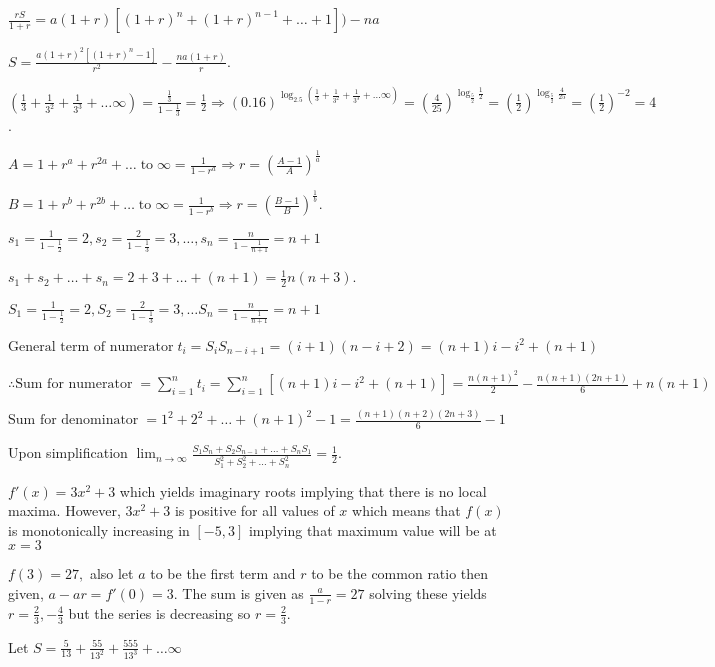   $\frac{rS}{1 + r} = a(1 + r)[(1 + r)^n + (1 + r)^{n - 1}  + \ldots + 1]) - na$

  $S = \frac{a(1 + r)^2[(1 + r)^n - 1]}{r^2} - \frac{na(1 + r)}{r}$.
\item $\left(\frac{1}{3} + \frac{1}{3^2} + \frac{1}{3^3} + \ldots \infty\right) = \frac{\frac{1}{3}}{1 -
  \frac{1}{3}} = \frac{1}{2} \Rightarrow (0.16)^{\log_{2.5}\left(\frac{1}{3} + \frac{1}{3^2} + \frac{1}{3^3} + \ldots \infty\right)} =
  \left(\frac{4}{25}\right)^{\log_{\tfrac{5}{2}}\frac{1}{2}} =
  \left(\frac{1}{2}\right)^{\log_{\tfrac{5}{2}}\frac{4}{25}} = \left(\frac{1}{2}\right)^{-2} = 4$.
\item $A = 1 + r^a + r^{2a} + \ldots \;\text{to}\;\infty = \frac{1}{1 - r^a} \Rightarrow r = \left(\frac{A - 1}{A}\right)^{\frac{1}{a}}$

  $B = 1 + r^b + r^{2b} + \ldots \;\text{to}\;\infty = \frac{1}{1 - r^b} \Rightarrow r = \left(\frac{B -
  1}{B}\right)^{\frac{1}{b}}$.
\item $s_1 = \frac{1}{1 - \frac{1}{2}} = 2, s_2 = \frac{2}{1 - \frac{1}{3}} = 3,\ldots, s_n = \frac{n}{1 -
  \frac{1}{n + 1}} = n + 1$

  $s_1 + s_2 + \ldots + s_n = 2 + 3 + \ldots + (n + 1) = \frac{1}{2}n(n + 3)$.
\item $S_1 = \frac{1}{1 - \frac{1}{2}} = 2, S_2 = \frac{2}{1 - \frac{1}{3}} = 3,\ldots S_n = \frac{n}{1 -
  \frac{1}{n + 1}} = n + 1$

  $\text{General term of numerator}\;t_i = S_iS_{n - i + 1} = (i + 1)(n - i + 2) = (n + 1)i - i^2 + (n + 1)$

  $\therefore \text{Sum for numerator}\; = \displaystyle\sum_{i=1}^nt_i = \sum_{i=1}^n [(n + 1)i - i^2 + (n + 1)] =
  \frac{n(n + 1)^2}{2} - \frac{n(n + 1)(2n + 1)}{6} + n(n + 1)$

  $\text{Sum for denominator}\;= 1^2 + 2^2 + \ldots + (n + 1)^2 - 1 = \frac{(n + 1)(n + 2)(2n + 3)}{6} - 1$

  Upon simplification $\displaystyle\lim_{n\to \infty} \frac{S_1S_n + S_2S_{n - 1} + \ldots + S_nS_1}{S_1^2 + S_2^2 +
    \ldots + S_n^2} = \frac{1}{2}$.
\item $f'(x) = 3x^2 + 3$ which yields imaginary roots implying that there is no local maxima. However, $3x^2
  + 3$ is positive for all values of $x$ which means that $f(x)$ is monotonically increasing in $[-5, 3]$
  implying that maximum value will be at $x = 3$

  $f(3) = 27,$ also let $a$ to be the first term and $r$ to be the common ratio then given, $a - ar = f'(0)
  = 3.$ The sum is given as $\frac{a}{1 - r} = 27$ solving these yields $r = \frac{2}{3}, -\frac{4}{3}$ but
  the series is decreasing so $r = \frac{2}{3}$.
\item Let $S = \frac{5}{13} + \frac{55}{13^2} + \frac{555}{13^3} + \ldots \infty$

